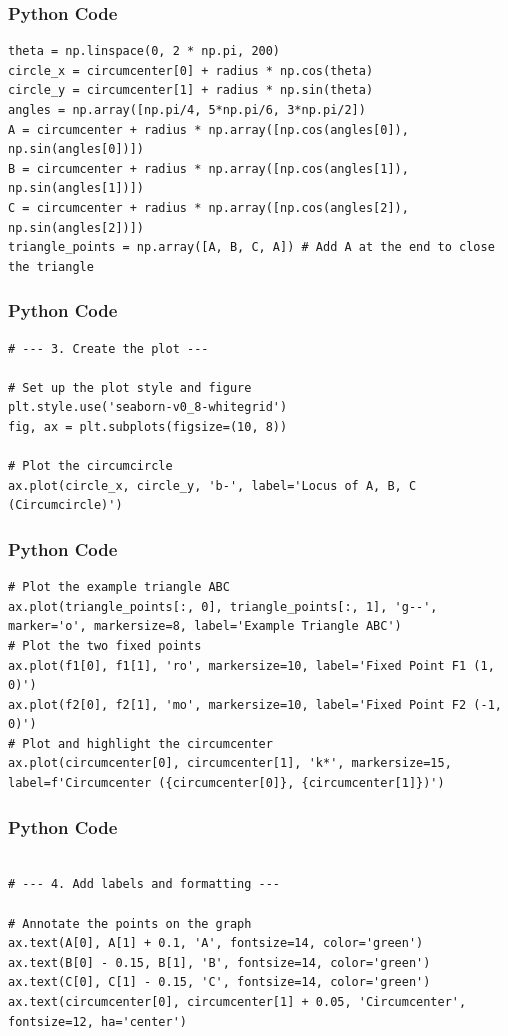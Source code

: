\documentclass{beamer}
\begin{document}
\begin{frame}[fragile]
\frametitle{Python Code}
\begin{lstlisting}
theta = np.linspace(0, 2 * np.pi, 200)
circle_x = circumcenter[0] + radius * np.cos(theta)
circle_y = circumcenter[1] + radius * np.sin(theta)
angles = np.array([np.pi/4, 5*np.pi/6, 3*np.pi/2])
A = circumcenter + radius * np.array([np.cos(angles[0]), np.sin(angles[0])])
B = circumcenter + radius * np.array([np.cos(angles[1]), np.sin(angles[1])])
C = circumcenter + radius * np.array([np.cos(angles[2]), np.sin(angles[2])])
triangle_points = np.array([A, B, C, A]) # Add A at the end to close the triangle
\end{lstlisting}
\end{frame}

\begin{frame}[fragile]
\frametitle{Python Code}
\begin{lstlisting}
# --- 3. Create the plot ---

# Set up the plot style and figure
plt.style.use('seaborn-v0_8-whitegrid')
fig, ax = plt.subplots(figsize=(10, 8))

# Plot the circumcircle
ax.plot(circle_x, circle_y, 'b-', label='Locus of A, B, C (Circumcircle)')

\end{lstlisting}
\end{frame}

\begin{frame}[fragile]
\frametitle{Python Code}
\begin{lstlisting}
# Plot the example triangle ABC
ax.plot(triangle_points[:, 0], triangle_points[:, 1], 'g--', marker='o', markersize=8, label='Example Triangle ABC')
# Plot the two fixed points
ax.plot(f1[0], f1[1], 'ro', markersize=10, label='Fixed Point F1 (1, 0)')
ax.plot(f2[0], f2[1], 'mo', markersize=10, label='Fixed Point F2 (-1, 0)')
# Plot and highlight the circumcenter
ax.plot(circumcenter[0], circumcenter[1], 'k*', markersize=15, label=f'Circumcenter ({circumcenter[0]}, {circumcenter[1]})')
\end{lstlisting}
\end{frame}

\begin{frame}[fragile]
\frametitle{Python Code}
\begin{lstlisting}

# --- 4. Add labels and formatting ---

# Annotate the points on the graph
ax.text(A[0], A[1] + 0.1, 'A', fontsize=14, color='green')
ax.text(B[0] - 0.15, B[1], 'B', fontsize=14, color='green')
ax.text(C[0], C[1] - 0.15, 'C', fontsize=14, color='green')
ax.text(circumcenter[0], circumcenter[1] + 0.05, 'Circumcenter', fontsize=12, ha='center')

\end{lstlisting}
\end{frame}
\end{document}
